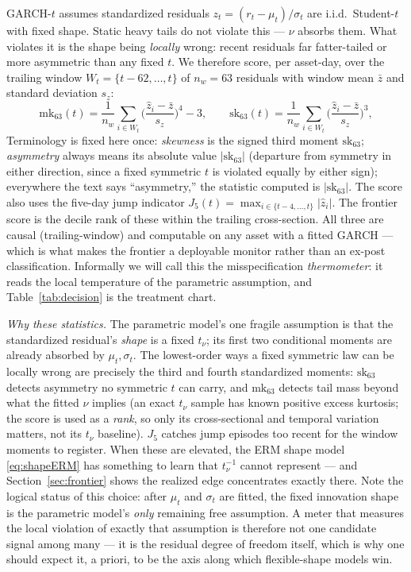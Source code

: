 \documentclass[11pt]{article}
\theoremstyle{remark}
\begin{document}
GARCH-$t$ assumes standardized residuals $z_t = (r_t - \mu_t)/\sigma_t$
are i.i.d.\ Student-$t$ with fixed shape. Static heavy tails do not
violate this --- $\nu$ absorbs them. What violates it is the shape being
\emph{locally} wrong: recent residuals far fatter-tailed or more
asymmetric than any fixed $t$. We therefore score, per asset-day, over
the trailing window $W_t = \{t-62,\dots,t\}$ of $n_w = 63$ residuals
with window mean $\bar{z}$ and standard deviation $s_z$:
\begin{equation}
\mathrm{mk}_{63}(t) = \frac{1}{n_w}\sum_{i\in W_t}
\Big(\frac{\widehat{z}_i - \bar{z}}{s_z}\Big)^{4} - 3,
\qquad
\mathrm{sk}_{63}(t) = \frac{1}{n_w}\sum_{i\in W_t}
\Big(\frac{\widehat{z}_i - \bar{z}}{s_z}\Big)^{3},
\label{eq:score}
\end{equation}
Terminology is fixed here once: \emph{skewness} is the signed third
moment $\mathrm{sk}_{63}$; \emph{asymmetry} always means its absolute
value $|\mathrm{sk}_{63}|$ (departure from symmetry in either
direction, since a fixed symmetric $t$ is violated equally by either
sign); everywhere the text says ``asymmetry,'' the statistic computed
is $|\mathrm{sk}_{63}|$. The score also uses the five-day jump indicator
$J_5(t) = \max_{i \in \{t-4,\dots,t\}} |\widehat{z}_i|$. The frontier
score is the decile rank of these within the trailing cross-section.
All three are causal (trailing-window) and computable on any asset with
a fitted GARCH --- which is what makes the frontier a deployable monitor
rather than an ex-post classification. Informally we will call this the
misspecification \emph{thermometer}: it reads the local temperature of
the parametric assumption, and Table~\ref{tab:decision} is the treatment
chart.

\emph{Why these statistics.} The parametric model's one fragile
assumption is that the standardized residual's \emph{shape} is a fixed
$t_\nu$; its first two conditional moments are already absorbed by
$\mu_t, \sigma_t$. The lowest-order ways a fixed symmetric law can be
locally wrong are precisely the third and fourth standardized moments:
$\mathrm{sk}_{63}$ detects asymmetry no symmetric $t$ can carry, and
$\mathrm{mk}_{63}$ detects tail mass beyond what the fitted $\nu$
implies (an exact $t_\nu$ sample has known positive excess kurtosis;
the score is used as a \emph{rank}, so only its cross-sectional and
temporal variation matters, not its $t_\nu$ baseline). $J_5$ catches
jump episodes too recent for the window moments to register. When these
are elevated, the ERM shape model \eqref{eq:shapeERM} has something to
learn that $t_\nu^{-1}$ cannot represent --- and Section~\ref{sec:frontier}
shows the realized edge concentrates exactly there. Note the logical
status of this choice: after $\mu_t$ and $\sigma_t$ are fitted, the
fixed innovation shape is the parametric model's \emph{only} remaining
free assumption. A meter that measures the local violation of exactly
that assumption is therefore not one candidate signal among many --- it
is the residual degree of freedom itself, which is why one should
expect it, a priori, to be the axis along which flexible-shape models
win.
\end{document}
